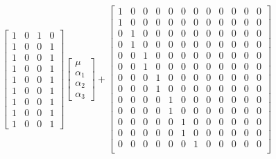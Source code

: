 \documentclass[paper=a4, fontsize=11pt]{scrartcl} %
\begin{document}
$$\begin{bmatrix}
                             1 & 0 & 1 & 0 \\
                             1 & 0 & 0 & 1 \\
                             1 & 0 & 0 & 1 \\
                             1 & 0 & 0 & 1 \\
                             1 & 0 & 0 & 1 \\
                             1 & 0 & 0 & 1 \\
                             1 & 0 & 0 & 1 \\
                             1 & 0 & 0 & 1 \\
                             1 & 0 & 0 & 1 
\end{bmatrix}
\begin{bmatrix} 
\mu \\ \alpha_1\\ \alpha_2 \\ \alpha_3
\end{bmatrix}
+
\begin{bmatrix} 1 & 0 & 0 & 0 & 0 & 0 & 0 & 0 & 0 & 0 & 0 & 0\\
                             1 & 0 & 0 & 0 & 0 & 0 & 0 & 0 & 0 & 0 & 0 & 0\\
                             0 & 1 & 0 & 0 & 0 & 0 & 0 & 0 & 0 & 0 & 0 & 0\\
                             0 & 1 & 0 & 0 & 0 & 0 & 0 & 0 & 0 & 0 & 0 & 0\\
                             0 & 0 & 1 & 0 & 0 & 0 & 0 & 0 & 0 & 0 & 0 & 0\\
                             0 & 0 & 1 & 0 & 0 & 0 & 0 & 0 & 0 & 0 & 0 & 0\\
                             0 & 0 & 0 & 1 & 0 & 0 & 0 & 0 & 0 & 0 & 0 & 0\\
                             0 & 0 & 0 & 1 & 0 & 0 & 0 & 0 & 0 & 0 & 0 & 0\\
                             0 & 0 & 0 & 0 & 1 & 0 & 0 & 0 & 0 & 0 & 0 & 0\\
                             0 & 0 & 0 & 0 & 1 & 0 & 0 & 0 & 0 & 0 & 0 & 0\\
                             0 & 0 & 0 & 0 & 0 & 1 & 0 & 0 & 0 & 0 & 0 & 0\\
                             0 & 0 & 0 & 0 & 0 & 1 & 0 & 0 & 0 & 0 & 0 & 0\\
                             0 & 0 & 0 & 0 & 0 & 0 & 1 & 0 & 0 & 0 & 0 & 0\\

\end{bmatrix}$$
\end{document}
